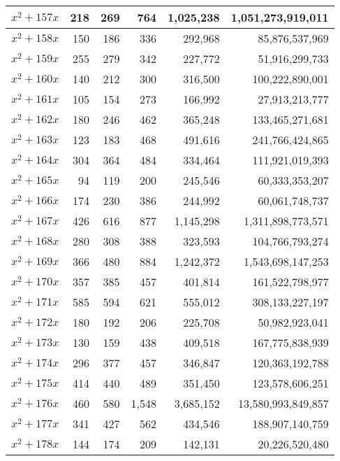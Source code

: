 \documentclass[a4paper]{amsproc}
\theoremstyle{plain}
\begin{document}
\begin{longtable}{ | l | r | r | r | r | r | }
$x^2 + 157x$ & 218 & 269 & 764 & 1{,}025{,}238 & 1{,}051{,}273{,}919{,}011 \\ \hline
$x^2 + 158x$ & 150 & 186 & 336 & 292{,}968 & 85{,}876{,}537{,}969 \\ \hline
$x^2 + 159x$ & 255 & 279 & 342 & 227{,}772 & 51{,}916{,}299{,}733 \\ \hline
$x^2 + 160x$ & 140 & 212 & 300 & 316{,}500 & 100{,}222{,}890{,}001 \\ \hline
$x^2 + 161x$ & 105 & 154 & 273 & 166{,}992 & 27{,}913{,}213{,}777 \\ \hline
$x^2 + 162x$ & 180 & 246 & 462 & 365{,}248 & 133{,}465{,}271{,}681 \\ \hline
$x^2 + 163x$ & 123 & 183 & 468 & 491{,}616 & 241{,}766{,}424{,}865 \\ \hline
$x^2 + 164x$ & 304 & 364 & 484 & 334{,}464 & 111{,}921{,}019{,}393 \\ \hline
$x^2 + 165x$ & 94 & 119 & 200 & 245{,}546 & 60{,}333{,}353{,}207 \\ \hline
$x^2 + 166x$ & 174 & 230 & 386 & 244{,}992 & 60{,}061{,}748{,}737 \\ \hline
$x^2 + 167x$ & 426 & 616 & 877 & 1{,}145{,}298 & 1{,}311{,}898{,}773{,}571 \\ \hline
$x^2 + 168x$ & 280 & 308 & 388 & 323{,}593 & 104{,}766{,}793{,}274 \\ \hline
$x^2 + 169x$ & 366 & 480 & 884 & 1{,}242{,}372 & 1{,}543{,}698{,}147{,}253 \\ \hline
$x^2 + 170x$ & 357 & 385 & 457 & 401{,}814 & 161{,}522{,}798{,}977 \\ \hline
$x^2 + 171x$ & 585 & 594 & 621 & 555{,}012 & 308{,}133{,}227{,}197 \\ \hline
$x^2 + 172x$ & 180 & 192 & 206 & 225{,}708 & 50{,}982{,}923{,}041 \\ \hline
$x^2 + 173x$ & 130 & 159 & 438 & 409{,}518 & 167{,}775{,}838{,}939 \\ \hline
$x^2 + 174x$ & 296 & 377 & 457 & 346{,}847 & 120{,}363{,}192{,}788 \\ \hline
$x^2 + 175x$ & 414 & 440 & 489 & 351{,}450 & 123{,}578{,}606{,}251 \\ \hline
$x^2 + 176x$ & 460 & 580 & 1{,}548 & 3{,}685{,}152 & 13{,}580{,}993{,}849{,}857 \\ \hline
$x^2 + 177x$ & 341 & 427 & 562 & 434{,}546 & 188{,}907{,}140{,}759 \\ \hline
$x^2 + 178x$ & 144 & 174 & 209 & 142{,}131 & 20{,}226{,}520{,}480 \\ \hline

\end{longtable}
\end{document}
